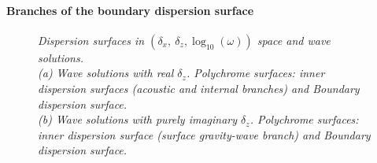 \paragraph{Branches of the boundary dispersion surface}
%
\begin{figure}[h]
	\centering
	\centering		
	\caption{\textit{Dispersion surfaces in $(\delta_x,\ \delta_z,\log_{10}(\omega))$  space and wave solutions.\\
			 (a) Wave solutions with real $\delta_z$. Polychrome surfaces: inner dispersion surfaces (acoustic and internal branches) and Boundary dispersion surface.\\
			 (b) Wave solutions with purely imaginary $\delta_z$. Polychrome surfaces: inner dispersion surface (surface gravity-wave branch) and Boundary dispersion surface.
	}
}
\label{FigDispSolutions}
\end{figure}
